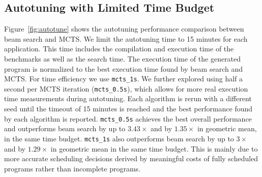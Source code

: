 \subsection{Autotuning with Limited Time Budget}
Figure~\ref{fig:autotune} shows the autotuning performance comparison between beam search and MCTS. We limit the autotuning time to 15 minutes for each application. This time includes the compilation and execution time of the benchmarks as well as the search time. The execution time of the generated program is normalized to the best execution time found by beam search and MCTS. For time efficiency we use \texttt{mcts\_1s}. We further explored using half a second per MCTS iteration (\texttt{mcts\_0.5s}), which allows for more real execution time measurements during autotuning. Each algorithm is rerun with a different seed until the timeout of 15 minutes is reached and the best performance found by each algorithm is reported. \texttt{mcts\_0.5s} achieves the best overall performance and outperforms beam search by up to $3.43\times$ and by $1.35\times$ in geometric mean, in the same time budget. \texttt{mcts\_1s} also outperforms beam search by up to $3\times$ and by $1.29\times$ in geometric mean in the same time budget. This is mainly due to more accurate scheduling decisions derived by meaningful costs of fully scheduled programs rather than incomplete programs. 



